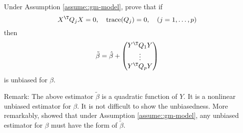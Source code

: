 Under Assumption \ref{assume::gm-model}, prove that if 
$$
X^{\T} Q_j X = 0, \quad \text{trace}(Q_j) = 0, \quad (j=1,\ldots, p)
$$
then
$$
\tilde\beta = \hat\beta + \begin{pmatrix}
Y^{\T} Q_1 Y \\
\vdots \\
Y^{\T} Q_p Y 
\end{pmatrix}
$$
is unbiased for $\beta$. 


Remark: The above estimator $\tilde\beta $ is a quadratic function of $Y$. It is a nonlinear unbiased estimator for $\beta$. It is not difficult to show the unbiasedness. More remarkably, \citet[][Theorem 4.3]{koopmann1982parameterschatzung} showed that under Assumption \ref{assume::gm-model}, any unbiased estimator for $\beta$ must have the form of $\tilde\beta $.



